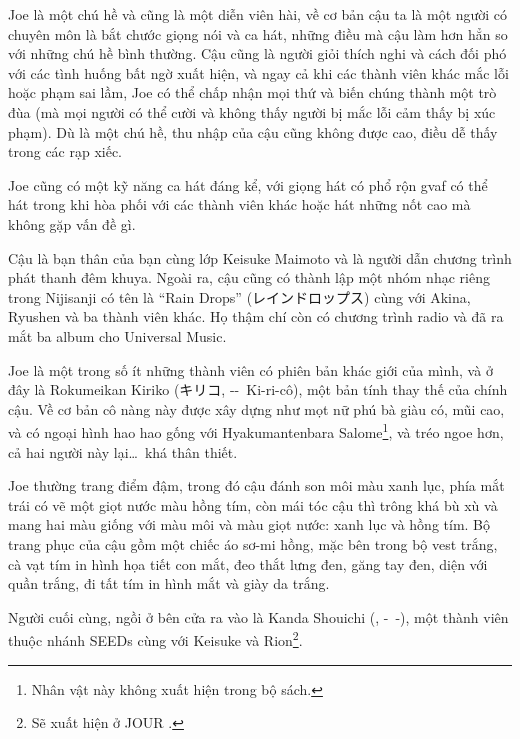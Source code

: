 \documentclass[../main.tex]{subfiles}
\begin{document}
Joe là một chú hề và cũng là một diễn viên hài, về cơ bản cậu ta là một người có chuyên môn là bắt chước giọng nói và ca hát, những điều mà cậu làm hơn hẳn so với những chú hề bình thường. Cậu cũng là người giỏi thích nghi và cách đối phó với các tình huống bất ngờ xuất hiện, và ngay cả khi các thành viên khác mắc lỗi hoặc phạm sai lầm, Joe có thể chấp nhận mọi thứ và biến chúng thành một trò đùa (mà mọi người có thể cười và không thấy người bị mắc lỗi cảm thấy bị xúc phạm). Dù là một chú hề, thu nhập của cậu cũng không được cao, điều dễ thấy trong các rạp xiếc.

Joe cũng có một kỹ năng ca hát đáng kể, với giọng hát có phổ rộn gvaf có thể hát trong khi hòa phối với các thành viên khác hoặc hát những nốt cao mà không gặp vấn đề gì.

Cậu là bạn thân của bạn cùng lớp Keisuke Maimoto và là người dẫn chương trình phát thanh đêm khuya. Ngoài ra, cậu cũng có thành lập một nhóm nhạc riêng trong Nijisanji có tên là ``Rain Drops'' (レインドロップス) cùng với Akina, Ryushen và ba thành viên khác. Họ thậm chí còn có chương trình radio và đã ra mắt ba album cho Universal Music.

Joe là một trong số ít những thành viên có phiên bản khác giới của mình, và ở đây là Rokumeikan Kiriko (キリコ, --\ Ki-ri-cô), một bản tính thay thế của chính cậu. Về cơ bản cô nàng này được xây dựng như mọt nữ phú bà giàu có, mũi cao, và có ngoại hình hao hao gống với Hyakumantenbara Salome\footnote{Nhân vật này không xuất hiện trong bộ sách.}, và tréo ngoe hơn, cả hai người này lại\dots\ khá thân thiết.

Joe thường trang điểm đậm, trong đó cậu đánh son môi màu xanh lục, phía mắt trái có vẽ một giọt nước màu hồng tím, còn mái tóc cậu thì trông khá bù xù và mang hai màu giống với màu môi và màu giọt nước: xanh lục và hồng tím. Bộ trang phục của cậu gồm một chiếc áo sơ-mi hồng, mặc bên trong bộ vest trắng, cà vạt tím in hình họa tiết con mắt, đeo thắt lưng đen, găng tay đen, diện với quần trắng, đi tất tím in hình mắt và giày da trắng.


Người cuối cùng, ngồi ở bên cửa ra vào là Kanda Shouichi (, -\ -), một thành viên thuộc nhánh SEEDs cùng với Keisuke và Rion\footnote{Sẽ xuất hiện ở {\flaregothic JOUR }.}.
\end{document}
